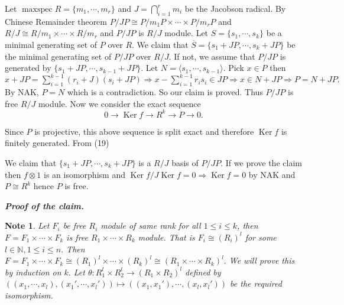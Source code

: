 \documentclass[11pt]{amsart}
\newtheorem{note}[theorem]{Note}
\newcommand{\NN}{\mathbb N}
\newcommand\isom{\mathrel{\stackon[-0.1ex]{\makebox*{\scalebox{1.08}{\AC}}{=\hfill\llap{=}}}{{\AC}}}}
\newcommand\nvisom{\rotatebox[origin=cc] {-90}{$ \isom $}}
\newcommand{\gen}[1]{\langle#1\rangle}
\DeclareMathOperator{\Ker}{\text{Ker}}
\DeclareMathOperator{\mspec}{\text{maxspec}}
\begin{document}
\proof Let $\mspec R=\{m_1,\cdots, m_r\}$ and $J=\displaystyle\bigcap_{i=1}^r m_i$ be the Jacobson radical. By Chinese Remainder theorem $P/JP\cong P/m_1P\times\cdots\times P/m_rP$ and $R/J\cong R/m_1\times\cdots\times R/m_r$ and $P/JP$ is $R/J$ module. Let $S=\{s_1,\cdots,s_k\}$ be a minimal generating set of $P$ over $R$. We claim that $\overline{S}=\{s_1+JP,\cdots,s_k+JP\}$ be the minimal generating set of $P/JP$ over $R/J.$ If not, we assume that $P/JP$ is generated by $\{s_1+JP,\cdots,s_{k-1}+JP\}$. Let $N=\gen{s_1,\cdots,s_{k-1}}.$  Pick $x\in P$ then $x+JP=\displaystyle\sum_{i=1}^{k-1} (r_i+J)(s_i+JP) \Rightarrow x-\displaystyle\sum_{i=1}^{k-1} r_is_i\in JP \Rightarrow x\in N+JP \Rightarrow P=N+JP.$ By NAK, $P=N$ which is a contradiction. So our claim is proved. Thus $P/JP$ is free $R/J$ module. Now we consider the exact sequence \begin{equation}
0\to \Ker f\to R^k\to P\to 0.
\end{equation}

Since $P$ is projective, this above sequence is split exact and therefore $\Ker f$ is finitely generated. From (19) \begin{center}


\end{center}

We claim that $\{s_1+JP,\cdots,s_k+JP\}$ is a $R/J$ basis of $P/JP$. If we prove the claim then $f\otimes 1$ is an isomorphism and $\Ker f/J\Ker f=0 \Rightarrow \Ker f=0$ by NAK and $P\cong R^k$ hence $P$ is free. 

\textit{\textbf{Proof of the claim.}}












\begin{note}

Let $F_i$ be free $R_i$ module of same rank for all $1\leq i\leq k$, then $F=F_1\times\cdots\times F_k$ is free $R_1\times\cdots\times R_k$ module. That is $F_i\cong (R_i)^l$ for some $l\in{\NN},1\leq i\leq n.$ Then $F=F_1\times\cdots\times F_k\cong (R_1)^l\times\cdots\times (R_k)^l\cong (R_1\times\cdots\times R_k)^l.$ We will prove this by induction on $k.$ Let $\theta:R_1^l\times R_2^l\to (R_1\times R_2)^l$ defined by $((x_1,\cdots,x_l),(x_1',\cdots,x_l'))\mapsto ((x_1,x_1'),\cdots,(x_l,x_l'))$ be the required isomorphism.

\end{note}
\end{document}
